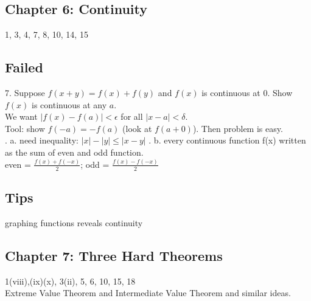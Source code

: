 \documentclass[a4paper, 12pt]{article}
\begin{document}
\subsection*{Chapter 6: Continuity}
1, 3, 4, 7, 8, 10, 14, 15\\



\subsection*{Failed}
7. Suppose $ f(x + y) = f(x) + f(y)$ and $f(x)$ is continuous at $0$. Show $f(x)$ is continuous at any $a$.\\
\textcolor[gray]{0.5}{We want $|f(x) - f(a)| < \epsilon$ for all $|x-a|< \delta$.\\
Tool: show $f(-a) = -f(a)$ (look at $f(a + 0)$). Then problem is easy.}\\

. a. need inequality: $|x| - |y| \leq |x-y|$
. b. every continuous function f(x) written as the sum of even and odd function. \\
\textcolor[gray]{0.5}{even = $\frac{f(x)+f(-x)}{2}$; odd = $\frac{f(x)-f(-x)}{2}$}

\subsection*{Tips}
graphing functions reveals continuity

\subsection*{Chapter 7: Three Hard Theorems}
1(viii),(ix)(x), 3(ii), 5, 6, 10, 15, 18\\
Extreme Value Theorem and Intermediate Value Theorem
and similar ideas.\\
\end{document}
